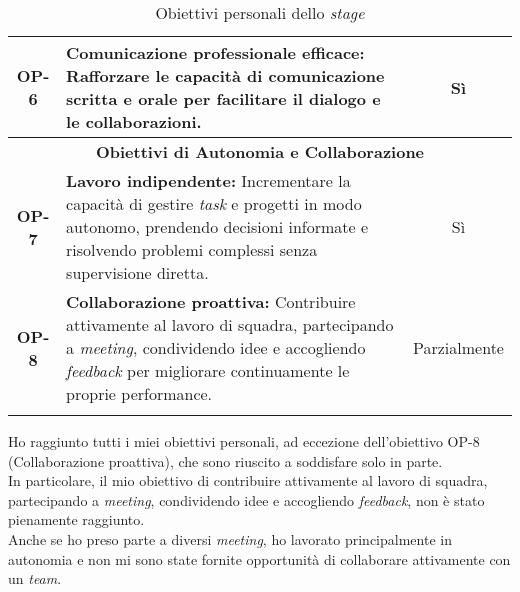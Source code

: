 \begin{longtable}{|c|>{\centering\arraybackslash}p{}|c|}
    \hline
    \textbf{OP-6} & \textbf{Comunicazione professionale efficace:} Rafforzare le capacità di comunicazione scritta e orale per facilitare il dialogo e le collaborazioni.& Sì \\
    \hline
    \multicolumn{3}{|c|}{\rowcolor{green!30} \textbf{Obiettivi di Autonomia e Collaborazione}} \\
    \hline
    \textbf{OP-7} & \textbf{Lavoro indipendente:} Incrementare la capacità di gestire \textit{task} e progetti in modo autonomo, prendendo decisioni informate e risolvendo problemi complessi senza supervisione diretta.& Sì \\
    \hline
    \textbf{OP-8} & \textbf{Collaborazione proattiva:} Contribuire attivamente al lavoro di squadra, partecipando a \textit{meeting}, condividendo idee e accogliendo \textit{feedback} per migliorare continuamente le proprie performance. & Parzialmente\\
    \hline
    \caption{Obiettivi personali dello \textit{stage}} %
    \label{tab:raggiungimento-obiettivi-personali-stage} %
\end{longtable}

\noindent Ho raggiunto tutti i miei obiettivi personali, ad eccezione dell'obiettivo OP-8 (Collaborazione proattiva), che sono riuscito a soddisfare solo in parte.\\

\noindent In particolare, il mio obiettivo di contribuire attivamente al lavoro di squadra, partecipando a \textit{meeting}, condividendo idee e accogliendo \textit{feedback}, non è stato pienamente raggiunto.\\
Anche se ho preso parte a diversi \textit{meeting}, ho lavorato principalmente in autonomia e non mi sono state fornite opportunità di collaborare attivamente con un \textit{team}.